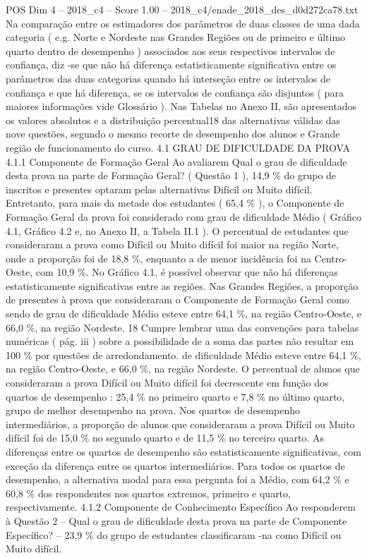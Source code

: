 \begin{textsample}{POS Dim 4 – 2018\_c4 – Score 1.00 – 2018\_c4/enade\_2018\_des\_d0d272ca78.txt}
Na comparação entre os estimadores dos parâmetros de duas classes de uma dada categoria ( e.g.
Norte e Nordeste nas Grandes Regiões ou de primeiro e último quarto dentro de desempenho ) associados aos seus respectivos intervalos de confiança, diz -se que não há diferença estatisticamente significativa entre os parâmetros das duas categorias quando há interseção entre os intervalos de confiança e que há diferença, se os intervalos de confiança são disjuntos ( para maiores informações vide Glossário ).
Nas Tabelas no Anexo II, são apresentados os valores absolutos e a distribuição percentual18 das alternativas válidas das nove questões, segundo o mesmo recorte de desempenho dos alunos e Grande região de funcionamento do curso. 4.1 GRAU DE DIFICULDADE DA PROVA 4.1.1 Componente de Formação Geral Ao avaliarem Qual o grau de dificuldade desta prova na parte de Formação Geral? ( Questão 1 ), 14,9 \% do grupo de inscritos e presentes optaram pelas alternativas Difícil ou Muito difícil.
Entretanto, para mais da metade dos estudantes ( 65,4 \% ), o Componente de Formação Geral da prova foi considerado com grau de dificuldade Médio ( Gráfico 4.1, Gráfico 4.2 e, no Anexo II, a Tabela II.1 ).
O percentual de estudantes que consideraram a prova como Difícil ou Muito difícil foi maior na região Norte, onde a proporção foi de 18,8 \%, enquanto a de menor incidência foi na Centro-Oeste, com 10,9 \%.
No Gráfico 4.1, é possível observar que não há diferenças estatisticamente significativas entre as regiões.
Nas Grandes Regiões, a proporção de presentes à prova que consideraram o Componente de Formação Geral como sendo de grau de dificuldade Médio esteve entre 64,1 \%, na região Centro-Oeste, e 66,0 \%, na região Nordeste. 18 Cumpre lembrar uma das convenções para tabelas numéricas ( pág. iii ) sobre a possibilidade de a soma das partes não resultar em 100 \% por questões de arredondamento. de dificuldade Médio esteve entre 64,1 \%, na região Centro-Oeste, e 66,0 \%, na região Nordeste.
O percentual de alunos que consideraram a prova Difícil ou Muito difícil foi decrescente em função dos quartos de desempenho : 25,4 \% no primeiro quarto e 7,8 \% no último quarto, grupo de melhor desempenho na prova.
Nos quartos de desempenho intermediários, a proporção de alunos que consideraram a prova Difícil ou Muito difícil foi de 15,0 \% no segundo quarto e de 11,5 \% no terceiro quarto.
As diferenças entre os quartos de desempenho são estatisticamente significativas, com exceção da diferença entre os quartos intermediários.
Para todos os quartos de desempenho, a alternativa modal para essa pergunta foi a Médio, com 64,2 \% e 60,8 \% dos respondentes nos quartos extremos, primeiro e quarto, respectivamente. 4.1.2 Componente de Conhecimento Específico Ao responderem à Questão 2 – Qual o grau de dificuldade desta prova na parte de Componente Específico? – 23,9 \% do grupo de estudantes classificaram -na como Difícil ou Muito difícil.

\end{textsample}
